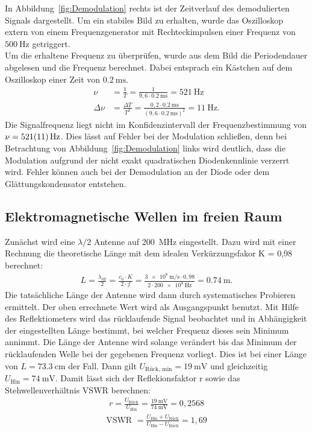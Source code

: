 \documentclass[a4paper,twoside,final]{article}
\begin{document}
In Abbildung~\ref{fig:Demodulation} rechts ist der Zeitverlauf des demodulierten Signals dargestellt. Um ein stabiles Bild zu erhalten, wurde das Oszilloskop extern von einem Frequenzgenerator mit Rechteckimpulsen einer Frequenz von $\SI{500}{\hertz}$ getriggert.\\
Um die erhaltene Frequenz zu überprüfen, wurde aus dem Bild die Periodendauer abgelesen und die Frequenz berechnet. Dabei entsprach ein Kästchen auf dem Oszilloskop einer Zeit von $\SI{0,2}{\milli\second}$.
\begin{align}
  \nu &= \frac{1}{T} = \frac{1}{9,6\cdot \SI{0,2}{\milli\second}} = \SI{521}{\hertz}\\
  \Delta \nu &= \frac{\Delta T}{T^2} = \frac{0,2\cdot \SI{0,2}{\milli\second}}{(9,6\cdot \SI{0,2}{\milli\second})^2} = \SI{11}{\hertz}.
\end{align}
Die Signalfrequenz liegt nicht im Konfidenzintervall der Frequenzbestimmung von $\nu = \SI{521\pm 11}{\hertz}$. Dies lässt auf Fehler bei der Modulation schließen, denn bei Betrachtung von Abbildung~\ref{fig:Demodulation} links wird deutlich, dass die Modulation aufgrund der nicht exakt quadratischen Diodenkennlinie verzerrt wird. Fehler können auch bei der Demodulation an der Diode oder dem Glättungskondensator entstehen.

\subsection{Elektromagnetische Wellen im freien Raum}
Zunächst wird eine $\lambda/2$ Antenne auf \SI{200}{\mega\hertz} eingestellt. Dazu wird mit einer Rechnung die theoretische Länge mit dem idealen Verkürzungsfakor K = 0,98 berechnet:
\begin{align}
L = \frac{\lambda_\text{eff}}{2} = \frac{c_0 \cdot K}{2 \cdot f} = \frac{\SI{3e8}{\metre\per\second} \cdot 0,98}{2 \cdot \SI{200e8}{\hertz}}  = \SI{0,74}{\metre}.
\end{align}
Die tatsächliche Länge der Antenne wird dann durch systematisches Probieren ermittelt. Der oben errechnete Wert wird als Ausgangspunkt benutzt. Mit Hilfe des Reflektiometers wird das rücklaufende Signal beobachtet und in Abhängigkeit der eingestellten Länge bestimmt, bei welcher Frequenz dieses sein Minimum annimmt. Die Länge der Antenne wird solange verändert bis das Minimum der rücklaufenden Welle bei der gegebenen Frequenz vorliegt. Dies ist bei einer Länge von $L = \SI{73,3}{\centi\metre}$ der Fall. Dann gilt $U_\text{Rück, min} = \SI{19}{\milli\volt}$ und gleichzeitig $U_\text{Hin} = \SI{74}{\milli\volt}$. Damit lässt sich der Reflekionsfaktor r sowie das Stehwellenverhältnis VSWR berechnen:
\begin{align}
r = \frac{U_\text{Rück}}{U_\text{Hin}} = \frac{\SI{19}{\milli\volt}}{\SI{74}{\milli\volt}} = 0,2568
\end{align}
\begin{align}
\text{VSWR } = \frac{U_\text{Hin}+U_\text{Rück}}{U_\text{Hin}-U_\text{Rück}} = 1,69
\end{align}
\end{document}
